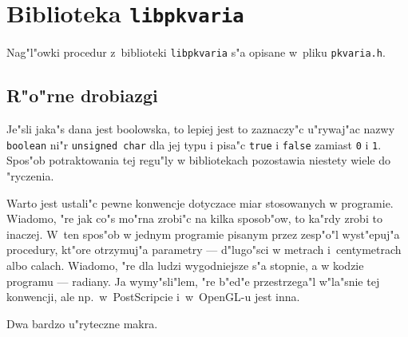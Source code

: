 

\chapter{Biblioteka \texttt{libpkvaria}}

Nag"l"owki procedur z~biblioteki \texttt{libpkvaria} s"a opisane w~pliku
\texttt{pkvaria.h}.

\section{R"o"rne drobiazgi}

\hspace*{\parindent}
Je"sli jaka"s dana jest boolowska, to lepiej jest to zaznaczy"c u"rywaj"ac
nazwy \texttt{boolean} ni"r \texttt{unsigned char} dla jej typu i pisa"c
\texttt{true} i \texttt{false} zamiast \texttt{0} i \texttt{1}. Spos"ob
potraktowania tej regu"ly w bibliotekach pozostawia niestety wiele do
"ryczenia.

Warto jest ustali"c pewne konwencje dotyczace miar stosowanych w programie.
Wiadomo, "re jak co"s mo"rna zrobi"c na kilka sposob"ow, to ka"rdy zrobi to
inaczej. W~ten spos"ob w jednym programie pisanym przez zesp"o"l
wyst"epuj"a procedury, kt"ore otrzymuj"a parametry --- d"lugo"sci w metrach
i~centymetrach albo calach. 
Wiadomo, "re dla ludzi wygodniejsze s"a stopnie, a w kodzie programu ---
radiany. Ja wymy"sli"lem, "re b"ed"e przestrzega"l w"la"snie tej konwencji,
ale np.\ w~PostScripcie i~w~OpenGL-u jest inna.

\vspace{\bigskipamount}
Dwa bardzo u"ryteczne makra.

